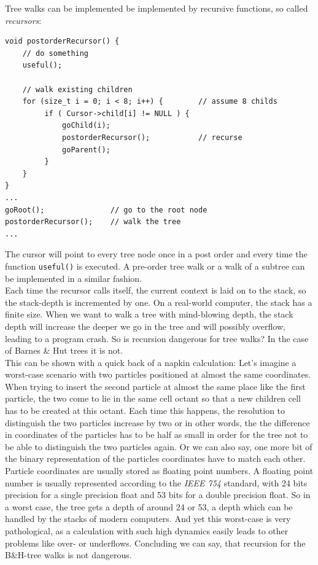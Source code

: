Tree walks can be implemented be implemented by recursive functions, so called \emph{recursors}:
\begin{verbatim}
void postorderRecursor() {
    // do something
    useful();
    
    // walk existing children
    for (size_t i = 0; i < 8; i++) {        // assume 8 childs
         if ( Cursor->child[i] != NULL ) {
             goChild(i);
             postorderRecursor();           // recurse
             goParent();
         }
    }
}
...
goRoot();               // go to the root node
postorderRecursor();    // walk the tree
...
\end{verbatim}

The cursor will point to every tree node once in a post order and every time the function \verb|useful()| is executed. A pre-order tree walk or a walk of a subtree can be implemented in a similar fashion.\\

Each time the recursor calls itself, the current context is laid on to the stack, so the stack-depth is incremented by one. On a real-world computer, the stack has a finite size. When we want to walk a tree with mind-blowing depth, the stack depth will increase the deeper we go in the tree and will possibly overflow, leading to a program crash. So is recursion dangerous for tree walks? In the case of Barnes \& Hut trees it is not.\\

This can be shown with a quick back of a napkin calculation: Let's imagine a worst-case scenario with two particles positioned at almost the same coordinates. When trying to insert the second particle at almost the same place like the first particle, the two come to lie in the same cell octant so that a new children cell has to be created at this octant. Each time this happens, the resolution to distinguish the two particles increase by two or in other words, the the difference in coordinates of the particles has to be half as small in order for the tree not to be able to distinguish the two particles again. Or we can also say, one more bit of the binary representation of the particles coordinates have to match each other. Particle coordinates are usually stored as floating point numbers. A floating point number is usually represented according to the \emph{IEEE 754} standard, with 24 bits precision for a single precision float and 53 bits for a double precision float. So in a worst case, the tree gets a depth of around 24 or 53, a depth which can be handled by the stacks of modern computers. And yet this worst-case is very pathological, as a calculation with such high dynamics easily leads to other problems like over- or underflows. Concluding we can say, that recursion for the B\&H-tree walks is not dangerous.

